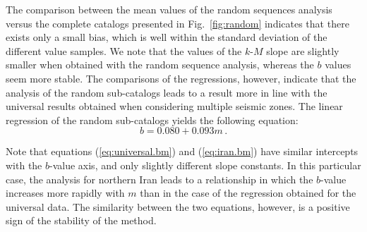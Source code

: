 The comparison between the mean values of the random sequences analysis versus the complete catalogs presented in Fig.~\ref{fig:random} indicates that there exists only a small bias, which is well within the standard deviation of the different value samples. We note that the values of the $k$-$M$ slope are slightly smaller when obtained with the random sequence analysis, whereas the $b$ values seem more stable. The comparisons of the regressions, however, indicate that the analysis of the random sub-catalogs leads to a result more in line with the universal results obtained when considering multiple seismic zones. The linear regression of the random sub-catalogs yields the following equation:
% 
\begin{equation}
	b = 0.080 + 0.093 m \, .
	\label{eq:iran.bm}
\end{equation}

Note that equations (\ref{eq:universal.bm}) and (\ref{eq:iran.bm}) have similar intercepts with the $b$-value axis, and only slightly different slope constants. In this particular case, the analysis for northern Iran leads to a relationship in which the $b$-value increases more rapidly with $m$ than in the case of the regression obtained for the universal data. The similarity between the two equations, however, is a positive sign of the stability of the method.

